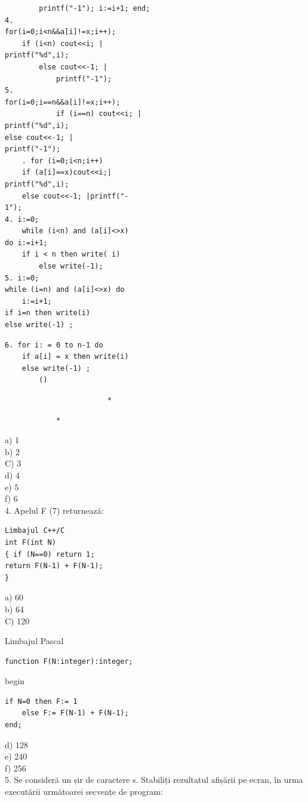\documentclass[10pt]{article}
\begin{document}
\begin{verbatim}
        printf("-1"); i:=i+1; end;
4.
for(i=0;i<n&&a[i]!=x;i++);
    if (i<n) cout<<i; |
printf("%d",i);
        else cout<<-1; |
            printf("-1");
5.
for(i=0;i==n&&a[i]!=x;i++);
            if (i==n) cout<<i; |
printf("%d",i);
else cout<<-1; |
printf("-1");
    . for (i=0;i<n;i++)
    if (a[i]==x)cout<<i;|
printf("%d",i);
    else cout<<-1; |printf("-
1");
4. i:=0;
    while (i<n) and (a[i]<>x)
do i:=i+1;
    if i < n then write( i)
        else write(-1);
5. i:=0;
while (i=n) and (a[i]<>x) do
    i:=i+1;
if i=n then write(i)
else write(-1) ;
\end{verbatim}

\begin{verbatim}
6. for i: = 0 to n-1 do
    if a[i] = x then write(i)
    else write(-1) ;
        ()
\end{verbatim}

\begin{verbatim}
                        *
\end{verbatim}

\begin{verbatim}
            *
\end{verbatim}

a) 1\\
b) 2\\
C) 3\\
d) 4\\
e) 5\\
f) 6\\
4. Apelul F (7) returnează:

\begin{verbatim}
Limbajul C++/C
int F(int N)
{ if (N==0) return 1;
return F(N-1) + F(N-1);
}
\end{verbatim}

a) 60\\
b) 64\\
C) 120

Limbajul Pascal

\begin{verbatim}
function F(N:integer):integer;
\end{verbatim}

begin

\begin{verbatim}
if N=0 then F:= 1
    else F:= F(N-1) + F(N-1);
end;
\end{verbatim}

d) 128\\
e) 240\\
f) 256\\
5. Se consideră un șir de caractere s. Stabiliți rezultatul afișării pe ecran, în urma executării următoarei secvențe de program:
\end{document}
